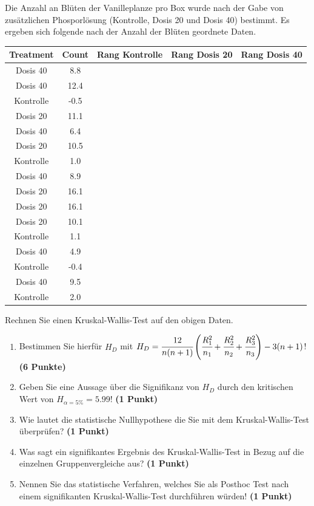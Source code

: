 \documentclass[a4paper, 9pt]{scrartcl}\usepackage[]{graphicx}\usepackage[]{xcolor}
\newenvironment{knitrout}{}{} %
\begin{document}
Die Anzahl an Bl{\"u}ten der Vanilleplanze pro Box wurde nach der Gabe von
zus{\"a}tzlichen Phosporl{\"o}sung (Kontrolle, Dosis 20 und Dosis 40) bestimmt. Es
ergeben sich folgende nach der Anzahl der Bl{\"u}ten geordnete Daten.

\begin{knitrout}
\color{fgcolor}\begin{table}[!h]
\centering
\begin{tabular}{ccccc}
\toprule
Treatment & Count & Rang Kontrolle & Rang Dosis 20 & Rang Dosis 40\\
\midrule
Dosis 40 & 8.8 &  &  & \\
Dosis 40 & 12.4 &  &  & \\
Kontrolle & -0.5 &  &  & \\
Dosis 20 & 11.1 &  &  & \\
Dosis 40 & 6.4 &  &  & \\
\addlinespace
Dosis 20 & 10.5 &  &  & \\
Kontrolle & 1.0 &  &  & \\
Dosis 40 & 8.9 &  &  & \\
Dosis 20 & 16.1 &  &  & \\
Dosis 20 & 16.1 &  &  & \\
\addlinespace
Dosis 20 & 10.1 &  &  & \\
Kontrolle & 1.1 &  &  & \\
Dosis 40 & 4.9 &  &  & \\
Kontrolle & -0.4 &  &  & \\
Dosis 40 & 9.5 &  &  & \\
\addlinespace
Kontrolle & 2.0 &  &  & \\
\bottomrule
\end{tabular}
\end{table}

\end{knitrout}

Rechnen Sie einen Kruskal-Wallis-Test auf den obigen Daten.

\begin{enumerate}
\item Bestimmen Sie hierf{\"u}r $H_D$ mit $H_D=
  \cfrac{12}{n(n+1)}\left(\cfrac{R_1^2}{n_1}+\cfrac{R_2^2}{n_2}
    + \cfrac{R_3^2}{n_3}\right)
  - 3(n+1)$! \textbf{(6 Punkte)} 
\item Geben Sie eine Aussage {\"u}ber die Signifikanz von $H_D$ durch
  den kritischen Wert von $H_{\alpha = 5\%} = 5.99$! \textbf{(1 Punkt)}
\item Wie lautet die statistische Nullhypothese die Sie mit dem Kruskal-Wallis-Test
  {\"u}berpr{\"u}fen? \textbf{(1 Punkt)}
\item Was sagt ein signifikantes Ergebnis des Kruskal-Wallis-Test in Bezug
  auf die einzelnen Gruppenvergleiche aus? \textbf{(1 Punkt)}
\item Nennen Sie das statistische Verfahren, welches Sie als Posthoc Test
  nach einem signifikanten Kruskal-Wallis-Test durchf{\"u}hren w{\"u}rden! \textbf{(1 Punkt)}
\end{enumerate} 
\clearpage
\end{document}
